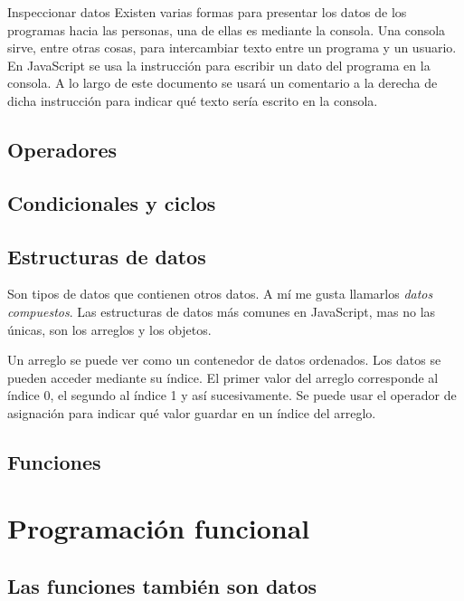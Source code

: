 \documentclass{article}
\newcommand{\code}[1]{\tcbox{\texttt{#1}}}
\newcommand{\codejs}[1]{\tcbox{\lstinline[style=ES6]{#1}}}
\begin{document}


\begin{bclogo}[logo=\bcinfo, couleurBarre=orange, noborder=true, couleur=white]{Inspeccionar datos}
Existen varias formas para presentar los datos de los programas hacia las personas, una de ellas es mediante la consola. Una consola sirve, entre otras cosas, para intercambiar texto entre un programa y un usuario. En JavaScript se usa la instrucción \codejs{console.log( /* dato */ )} para escribir un dato del programa en la consola. A lo largo de este documento se usará un comentario a la derecha de dicha instrucción para indicar qué texto sería escrito en la consola.
\end{bclogo}

\subsection*{Operadores}

\subsection*{Condicionales y ciclos}

\subsection*{Estructuras de datos}
Son tipos de datos que contienen otros datos. A mí me gusta llamarlos \textit{datos compuestos}. Las estructuras de datos más comunes en JavaScript, mas no las únicas, son los arreglos y los objetos.

Un arreglo se puede ver como un contenedor de datos ordenados. Los datos se pueden acceder mediante su índice. El primer valor del arreglo corresponde al índice 0, el segundo al índice 1 y así sucesivamente. Se puede usar el operador de asignación \code{=} para indicar qué valor guardar en un índice del arreglo.


\subsection*{Funciones}

\section*{Programación funcional}

\subsection*{Las funciones también son datos}
\end{document}
